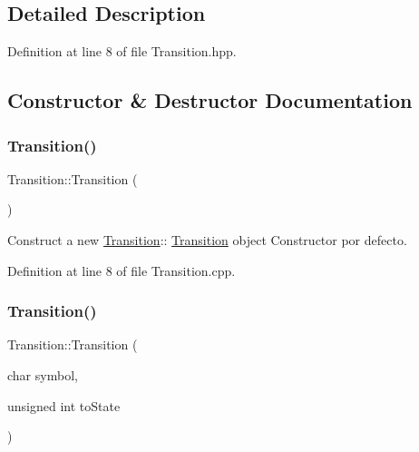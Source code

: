 \subsection{Detailed Description}


Definition at line 8 of file Transition.\+hpp.



\subsection{Constructor \& Destructor Documentation}
\mbox{\label{class_transition_a73b44b2338b11807f77b620a3e810f92}} 
\subsubsection{\texorpdfstring{Transition()}{Transition()}\hspace{0.1cm}{\footnotesize\ttfamily [1/3]}}
{\footnotesize\ttfamily Transition\+::\+Transition (\begin{DoxyParamCaption}{ }\end{DoxyParamCaption})}



Construct a new \hyperlink{class_transition}{Transition}\+:\+: \hyperlink{class_transition}{Transition} object Constructor por defecto. 



Definition at line 8 of file Transition.\+cpp.

\mbox{\label{class_transition_ab49cf908eba3466ddcd65b144d3c2fc4}} 
\subsubsection{\texorpdfstring{Transition()}{Transition()}\hspace{0.1cm}{\footnotesize\ttfamily [2/3]}}
{\footnotesize\ttfamily Transition\+::\+Transition (\begin{DoxyParamCaption}\item[{char}]{symbol,  }\item[{unsigned int}]{to\+State }\end{DoxyParamCaption})}



